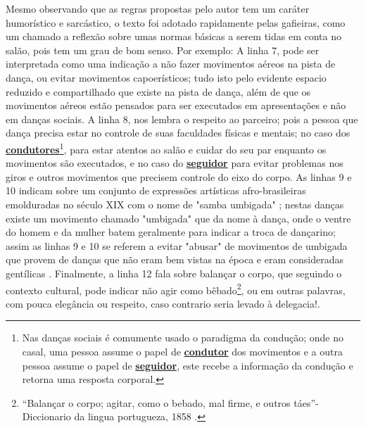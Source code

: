 Mesmo observando que as regras propostas pelo autor tem um caráter humorístico e sarcástico,
o texto foi adotado rapidamente pelas gafieiras, como um chamado a reflexão sobre umas
normas básicas a serem tidas em conta no salão, pois tem um grau de bom senso. Por exemplo: 
A linha 7, pode ser interpretada como uma indicação a 
não fazer movimentos aéreos na pista de dança,
ou  evitar movimentos capoerísticos; tudo isto
pelo evidente espacio reduzido e compartilhado que existe na pista de dança, 
além de que os movimentos aéreos estão pensados para ser
executados em apresentações e não em danças sociais. 
A linha 8, nos lembra o respeito ao parceiro; pois a pessoa que dança precisa
estar no controle de suas faculdades físicas e mentais; 
no caso dos \hyperref[def:Condutor]{\textbf{condutores}}\footnote{\label{footlab:conducao}Nas danças sociais é comumente usado o paradigma da condução; 
onde no casal, uma pessoa assume o papel de \hyperref[def:Condutor]{\textbf{condutor}} dos movimentos e 
a outra pessoa assume o papel de \hyperref[def:Seguidor]{\textbf{seguidor}}, este recebe a informação da condução e retorna uma resposta corporal.}, 
para estar atentos ao salão e cuidar do seu par enquanto os movimentos são executados, 
e no caso do \hyperref[def:Seguidor]{\textbf{seguidor}} para evitar problemas
nos giros e outros movimentos que precisem  controle do eixo do corpo.
As linhas 9 e 10 indicam sobre um conjunto de expressões artísticas 
afro-brasileiras emolduradas no século XIX com o nome de "samba umbigada" \cite[pp. 47]{diniz2008almanaque} \cite[pp. 85]{sandroni2001feitico}; nestas danças existe
um movimento chamado "umbigada" \cite[pp. 50]{da2015historia} que da nome à dança, onde o ventre do homem e da mulher batem geralmente para indicar
a troca de dançarino; assim as linhas 9 e 10 se referem a
 evitar "abusar" de movimentos de umbigada que provem de danças que não eram bem vistas na época e eram consideradas gentílicas \cite[pp. 85]{sandroni2001feitico}.
Finalmente,
a linha 12 fala sobre balançar o corpo, que seguindo o contexto cultural, 
pode indicar não agir como bêbado\footnote{``Balançar o corpo; agitar, como o bebado, mal firme, e outros táes''-Diccionario da lingua portugueza, 1858 \cite[pp.296]{diccionario1858}.}, ou em outras palavras,
com pouca elegância ou respeito,
caso contrario seria levado à delegacia!.


